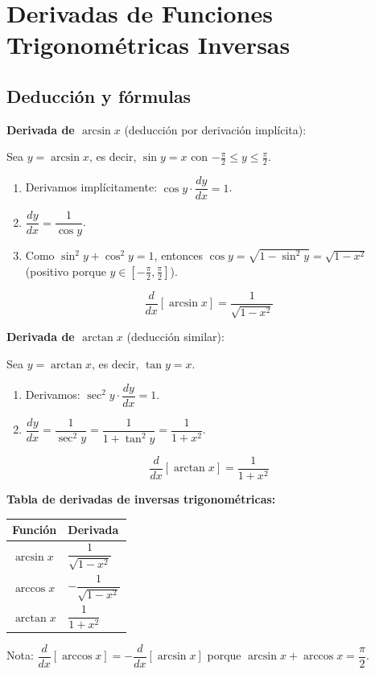 \documentclass[12pt, letterpaper]{article}
\begin{document}
\newpage


\section{Derivadas de Funciones Trigonométricas Inversas}

\subsection{Deducción y fórmulas}

\begin{cuadroteoria}
  \textbf{Derivada de $\arcsin x$} (deducción por derivación implícita):

  Sea $y = \arcsin x$, es decir, $\sin y = x$ con $-\frac{\pi}{2} \leq y \leq \frac{\pi}{2}$.
  \begin{enumerate}[leftmargin=*]
    \item Derivamos implícitamente: $\cos y \cdot \dfrac{dy}{dx} = 1$.
    \item $\dfrac{dy}{dx} = \dfrac{1}{\cos y}$.
    \item Como $\sin^2 y + \cos^2 y = 1$, entonces $\cos y = \sqrt{1 - \sin^2 y} = \sqrt{1 - x^2}$ (positivo porque $y \in [-\frac{\pi}{2}, \frac{\pi}{2}]$).
  \end{enumerate}
  $$\boxed{\frac{d}{dx}[\arcsin x] = \frac{1}{\sqrt{1 - x^2}}}$$

  \textbf{Derivada de $\arctan x$} (deducción similar):

  Sea $y = \arctan x$, es decir, $\tan y = x$.
  \begin{enumerate}[leftmargin=*]
    \item Derivamos: $\sec^2 y \cdot \dfrac{dy}{dx} = 1$.
    \item $\dfrac{dy}{dx} = \dfrac{1}{\sec^2 y} = \dfrac{1}{1 + \tan^2 y} = \dfrac{1}{1 + x^2}$.
  \end{enumerate}
  $$\boxed{\frac{d}{dx}[\arctan x] = \frac{1}{1 + x^2}}$$
\end{cuadroteoria}

\begin{cuadrosolucion}
  \textbf{Tabla de derivadas de inversas trigonométricas:}
  \begin{center}
    \begin{tabular}{ll}
      \toprule
      \textbf{Función} & \textbf{Derivada}            \\
      \midrule
      $\arcsin x$      & $\dfrac{1}{\sqrt{1 - x^2}}$  \\
      $\arccos x$      & $-\dfrac{1}{\sqrt{1 - x^2}}$ \\
      $\arctan x$      & $\dfrac{1}{1 + x^2}$         \\
      \bottomrule
    \end{tabular}
  \end{center}
  Nota: $\dfrac{d}{dx}[\arccos x] = -\dfrac{d}{dx}[\arcsin x]$ porque $\arcsin x + \arccos x = \dfrac{\pi}{2}$.
\end{cuadrosolucion}
\end{document}
